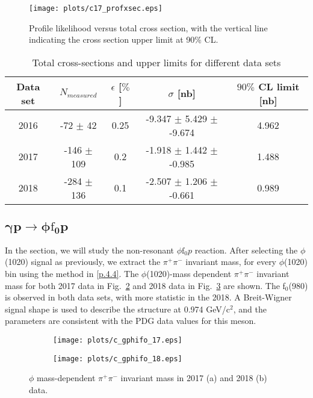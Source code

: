 \begin{figure}[H]
    \centering
    \texttt{[image: plots/c17\_profxsec.eps]}
    \caption{\label{fig.4.5.2.2}Profile likelihood versus total cross section, with the vertical line indicating the cross section upper limit at 90$\%$ CL.}
\end{figure}

\begin{table}[!htbp]
    \centering
    \caption{Total cross-sections and upper limits for different data sets}
    \label{tab.4.5.2}
    \begin{tabular}{|c|c|c|c|c|}
        \hline
        Data set & $N_{measured}$ & $\epsilon$ [$\%$] & $\sigma$ [nb] & $90\%$ CL limit [nb] \\
        \hline
        2016 &  -72 $\pm$ 42 & 0.25 & -9.347 $\pm$ 5.429 $\pm$ -9.674 & 4.962 \\
        \hline
        2017 & -146 $\pm$ 109 & 0.2 & -1.918 $\pm$ 1.442 $\pm$ -0.985 & 1.488 \\
        \hline
        2018 & -284 $\pm$ 136 & 0.1 & -2.507 $\pm$ 1.206 $\pm$ -0.661 & 0.989 \\
        \hline
    \end{tabular}
\end{table}

\subsection{\texorpdfstring{$\bm{\gamma p \rightarrow \phi \mathrm{f}_0 p}$}{}}
\label{p.4.5.3}

In the section, we will study the non-resonant $\phi \mathrm{f}_0 p$ reaction. After selecting the $\phi$(1020) signal as previously, we extract the $\pi^+ \pi^-$ invariant mass, for every $\phi$(1020) bin using the method in \ref{p.4.4}.
The $\phi$(1020)-mass dependent $\pi^+ \pi^-$ invariant mass for both 2017 data in Fig.~\ref{fig.4.5.3.1.a} and 2018 data in Fig.~\ref{fig.4.5.3.1.b} are shown. The f$_0$(980) is observed in both data sets, with more statistic in the 2018. A Breit-Wigner signal shape is used to describe the structure at 0.974 GeV/c$^2$, and the parameters are consistent with the PDG data values for this meson.

\begin{figure}[H]
    \centering
    \begin{subfigure}[b]{0.45\textwidth}
        \texttt{[image: plots/c\_gphifo\_17.eps]}
        \caption{}
        \label{fig.4.5.3.1.a}
    \end{subfigure}
    \begin{subfigure}[b]{0.45\textwidth}
        \texttt{[image: plots/c\_gphifo\_18.eps]}
        \caption{}
        \label{fig.4.5.3.1.b}
    \end{subfigure}
    \caption{$\phi$ mass-dependent $\pi^+ \pi^-$ invariant mass in 2017 (a) and 2018 (b) data.}
    \label{fig.4.5.3.1}
\end{figure}

